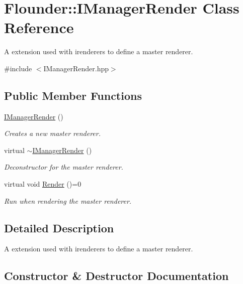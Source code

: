 \hypertarget{class_flounder_1_1_i_manager_render}{}\section{Flounder\+:\+:I\+Manager\+Render Class Reference}
\label{class_flounder_1_1_i_manager_render}


A extension used with irenderers to define a master renderer.  




{\ttfamily \#include $<$I\+Manager\+Render.\+hpp$>$}

\subsection*{Public Member Functions}
\begin{DoxyCompactItemize}
\item 
\hyperlink{class_flounder_1_1_i_manager_render_a19412490006a63c6b718ec10eeeb4f8f}{I\+Manager\+Render} ()
\begin{DoxyCompactList}\small\item\em Creates a new master renderer. \end{DoxyCompactList}\item 
virtual \hyperlink{class_flounder_1_1_i_manager_render_a30ea24933c1c02eb7dee1703ea37b9e3}{$\sim$\+I\+Manager\+Render} ()
\begin{DoxyCompactList}\small\item\em Deconstructor for the master renderer. \end{DoxyCompactList}\item 
virtual void \hyperlink{class_flounder_1_1_i_manager_render_a7c4c2209e25c292b94b59f94a1c35a53}{Render} ()=0
\begin{DoxyCompactList}\small\item\em Run when rendering the master renderer. \end{DoxyCompactList}\end{DoxyCompactItemize}


\subsection{Detailed Description}
A extension used with irenderers to define a master renderer. 



\subsection{Constructor \& Destructor Documentation}
\mbox{\label{class_flounder_1_1_i_manager_render_a19412490006a63c6b718ec10eeeb4f8f}} 
